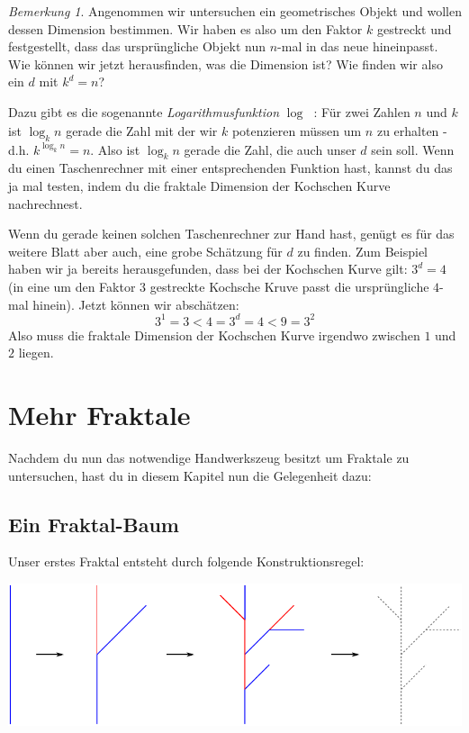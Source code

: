 \documentclass[a4paper,ngerman,12pt]{scrartcl}
\theoremstyle{definition}
\theoremstyle{plain}
\theoremstyle{remark}
\newtheorem{bem}[defn]{Bemerkung}
\begin{document}
\begin{bem}
Angenommen wir untersuchen ein geometrisches Objekt und wollen dessen Dimension bestimmen. Wir haben es also um den Faktor $k$ gestreckt und festgestellt, dass das ursprüngliche Objekt nun $n$-mal in das neue hineinpasst. Wie können wir jetzt herausfinden, was die Dimension ist? Wie finden wir also ein $d$ mit $k^d = n$?

Dazu gibt es die sogenannte \emph{Logarithmusfunktion} $\log_{\boxed{}}\boxed{\phantom{k}}$: Für zwei Zahlen $n$ und $k$ ist $\log_k n$ gerade die Zahl mit der wir $k$ potenzieren müssen um $n$ zu erhalten - d.h. $k^{\log_k n} = n$. Also ist $\log_k n$ gerade die Zahl, die auch unser $d$ sein soll. Wenn du einen Taschenrechner mit einer entsprechenden Funktion hast, kannst du das ja mal testen, indem du die fraktale Dimension der Kochschen Kurve nachrechnest.

Wenn du gerade keinen solchen Taschenrechner zur Hand hast, genügt es für das weitere Blatt aber auch, eine grobe Schätzung für $d$ zu finden. Zum Beispiel haben wir ja bereits herausgefunden, dass bei der Kochschen Kurve gilt: $3^d=4$ (in eine um den Faktor $3$ gestreckte Kochsche Kruve passt die ursprüngliche $4$-mal hinein). Jetzt können wir abschätzen:
\[3^1 = 3 < 4 = 3^d = 4 < 9 = 3^2\]
Also muss die fraktale Dimension der Kochschen Kurve irgendwo zwischen $1$ und $2$ liegen.
\end{bem}

\section{Mehr Fraktale}

Nachdem du nun das notwendige Handwerkszeug besitzt um Fraktale zu untersuchen, hast du in diesem Kapitel nun die Gelegenheit dazu:

\subsection{Ein Fraktal-Baum}

Unser erstes Fraktal entsteht durch folgende Konstruktionsregel:
\begin{center}
	\includegraphics[width=.7\textwidth]{Bilder/Baum-Konstruktion.pdf}
\end{center}
\end{document}
